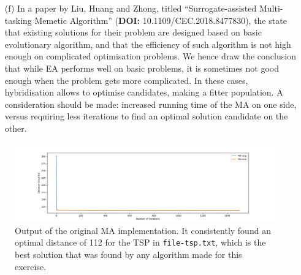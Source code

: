 \documentclass{scrartcl}
\begin{document}
\begin{itemize}
 \item[(f)] In a paper by Liu, Huang and Zhong, titled ``Surrogate-assisted Multi-tasking Memetic Algorithm'' (\textbf{DOI:} 10.1109/CEC.2018.8477830), the state that existing solutions for their problem are designed based on basic evolutionary algorithm, and that the efficiency of such algorithm is not high enough on complicated optimisation problems. We hence draw the conclusion that while EA performs well on basic problems, it is sometimes not good enough when the problem gets more complicated. In these cases, hybridisation allows to optimise candidates, making a fitter population. A consideration should be made: increased running time of the MA on one side, versus requiring less iterations to find an optimal solution candidate on the other.
\end{itemize}

\begin{figure}
\centering
 \includegraphics[width=\textwidth]{6/origMA2}

 \caption{Output of the original MA implementation. It consistently found an optimal distance of 112 for the TSP in \texttt{file-tsp.txt}, which is the best solution that was found by any algorithm made for this exercise.\label{fig:6a}}
\end{figure}
\end{document}
